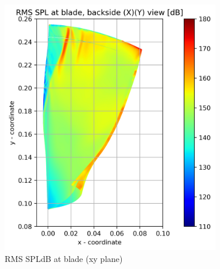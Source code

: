 \begin{figure}[ht]
	\centering
	\includegraphics[width=0.85\textwidth]{Figures/blade-xy-rms-spldb.png}
	\caption{RMS SPLdB at blade (xy plane)} \label{blade-xy-rms-spldb}
\end{figure}

